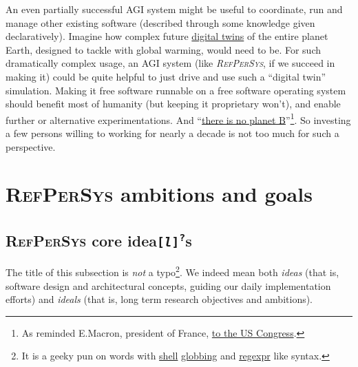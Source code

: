 \documentclass[11pt,a4paper,svgnames]{article}
\newcommand{\RefPerSys}{{\textit{\textsc{RefPerSys}}}}
\begin{document}
An even partially successful \textsc{AGI} system might be useful to
coordinate, run and manage other existing software (described through
some knowledge given declaratively). Imagine how complex future
\href{https://en.wikipedia.org/wiki/Digital_twin}{digital twins} of
the entire planet Earth, designed to tackle with global warming, would
need to be. For such dramatically complex usage, an AGI system (like
{\RefPerSys}, if we succeed in making it) could be quite helpful to
just drive and use such a ``digital twin'' simulation. Making it free
software runnable on a free software operating system should benefit
most of humanity (but keeping it proprietary won't), and enable
further or alternative experimentations. And
``\href{https://theresnoplanetb.net/}{there is no planet
  B}''\footnote{As reminded E.Macron, president of France,
  \href{https://www.bbc.com/news/av/world-us-canada-43900009/macron-to-us-congress-there-is-no-planet-b}{to
    the US Congress}.}. So investing a few persons willing to working
for nearly a decade is not too much for such a perspective.


\section{\textsc{RefPerSys} ambitions and goals}
\label{sec:ambitions-goals}

\subsection{\textsc{RefPerSys} core idea{\texttt{[\textit{l}]\textsuperscript{?}}}s}
\label{subsec:coreidea}

The title of this subsection is \emph{not} a typo\footnote{It is a
geeky pun on words with
\href{https://en.wikipedia.org/wiki/Unix_shell}{shell}
\href{https://en.wikipedia.org/wiki/Glob_(programming)}{globbing} and
\href{https://en.wikipedia.org/wiki/Regular\_expression}{regexpr} like
syntax.}. We indeed mean both \textit{ideas} (that is, software design
and architectural concepts, guiding our daily implementation efforts)
and \textit{ideals} (that is, long term research objectives and
ambitions).
\end{document}
